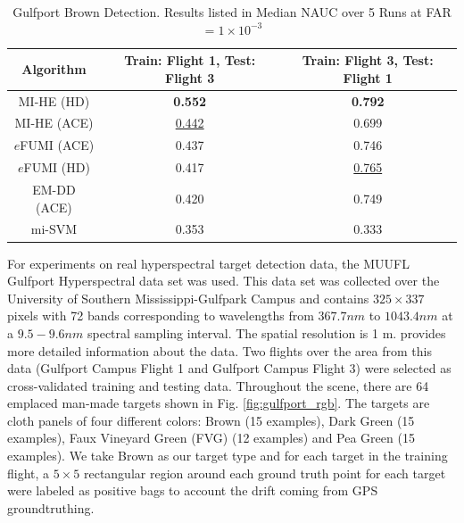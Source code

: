 \documentclass{article}
\begin{document}
\begin{table} 
	\begin{scriptsize}
		\begin{center}
			\caption{Gulfport Brown Detection. Results listed in Median NAUC over 5 Runs at FAR $=1\times10^{-3}$}\label{tab:AUC_gulfport}
			\begin{tabular}{|c|c|c|}
				\hline
				{Algorithm} 	&  {Train: Flight 1, Test: Flight 3}& {Train: Flight 3, Test: Flight 1} \\
				\hline\hline
				{MI-HE (HD)}&      \textbf{0.552}     &  \textbf{0.792}         \\\hline
				{MI-HE (ACE)}&          \underline{0.442}         &     {0.699}                       \\\hline
				{$e$FUMI (ACE)}&       0.437         &      0.746                    \\\hline
				{$e$FUMI (HD)}&        0.417         &      \underline{0.765}                     \\\hline
				{EM-DD (ACE)}&        {0.420}   &     {0.749}                      \\\hline
				{mi-SVM}&        0.353         &   0.333      \\\hline
			\end{tabular}
		\end{center}
	\end{scriptsize}
\end{table}


  For experiments on real hyperspectral target detection data, the MUUFL Gulfport Hyperspectral data set was used.  This data set was collected over the University of Southern Mississippi-Gulfpark Campus and contains $325\times337$ pixels with 72 bands corresponding to wavelengths from $367.7 nm$ to $1043.4 nm$ at a $9.5-9.6 nm$ spectral sampling interval. The spatial resolution is 1 m. \cite{gader:2013} provides more detailed information about the data. Two flights over the area from this data (Gulfport Campus Flight 1 and Gulfport Campus Flight 3) were selected as cross-validated training and testing data. Throughout the scene, there are 64 emplaced man-made targets shown in Fig. \ref{fig:gulfport_rgb}. The targets are cloth panels of four different colors: Brown (15 examples), Dark Green (15 examples), Faux Vineyard Green (FVG) (12 examples) and Pea Green (15 examples). We take Brown as our target type and for each target in the training flight, a $5\times5$ rectangular region around each ground truth point for each target were labeled as positive bags to account the drift coming from GPS groundtruthing. 
\end{document}
